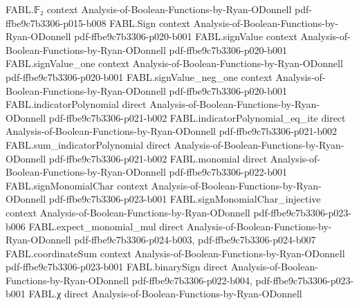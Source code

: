 \begin{theorem}
\label{FABL.heterogeneousBiasedFourierCoeff_eq_prod_sigma_mul_partialDerivative}
\leanok
{}
\proofstep
  {FABL.𝔽₂}
  {context}
  {Analysis-of-Boolean-Functions-by-Ryan-ODonnell}
  {pdf-ffbe9c7b3306-p015-b008}
\proofstep
  {FABL.Sign}
  {context}
  {Analysis-of-Boolean-Functions-by-Ryan-ODonnell}
  {pdf-ffbe9c7b3306-p020-b001}
\proofstep
  {FABL.signValue}
  {context}
  {Analysis-of-Boolean-Functions-by-Ryan-ODonnell}
  {pdf-ffbe9c7b3306-p020-b001}
\proofstep
  {FABL.signValue_one}
  {context}
  {Analysis-of-Boolean-Functions-by-Ryan-ODonnell}
  {pdf-ffbe9c7b3306-p020-b001}
\proofstep
  {FABL.signValue_neg_one}
  {context}
  {Analysis-of-Boolean-Functions-by-Ryan-ODonnell}
  {pdf-ffbe9c7b3306-p020-b001}
\proofstep
  {FABL.indicatorPolynomial}
  {direct}
  {Analysis-of-Boolean-Functions-by-Ryan-ODonnell}
  {pdf-ffbe9c7b3306-p021-b002}
\proofstep
  {FABL.indicatorPolynomial_eq_ite}
  {direct}
  {Analysis-of-Boolean-Functions-by-Ryan-ODonnell}
  {pdf-ffbe9c7b3306-p021-b002}
\proofstep
  {FABL.sum_indicatorPolynomial}
  {direct}
  {Analysis-of-Boolean-Functions-by-Ryan-ODonnell}
  {pdf-ffbe9c7b3306-p021-b002}
\proofstep
  {FABL.monomial}
  {direct}
  {Analysis-of-Boolean-Functions-by-Ryan-ODonnell}
  {pdf-ffbe9c7b3306-p022-b001}
\proofstep
  {FABL.signMonomialChar}
  {context}
  {Analysis-of-Boolean-Functions-by-Ryan-ODonnell}
  {pdf-ffbe9c7b3306-p023-b001}
\proofstep
  {FABL.signMonomialChar_injective}
  {context}
  {Analysis-of-Boolean-Functions-by-Ryan-ODonnell}
  {pdf-ffbe9c7b3306-p023-b006}
\proofstep
  {FABL.expect_monomial_mul}
  {direct}
  {Analysis-of-Boolean-Functions-by-Ryan-ODonnell}
  {pdf-ffbe9c7b3306-p024-b003,
    pdf-ffbe9c7b3306-p024-b007}
\proofstep
  {FABL.coordinateSum}
  {context}
  {Analysis-of-Boolean-Functions-by-Ryan-ODonnell}
  {pdf-ffbe9c7b3306-p023-b001}
\proofstep
  {FABL.binarySign}
  {direct}
  {Analysis-of-Boolean-Functions-by-Ryan-ODonnell}
  {pdf-ffbe9c7b3306-p022-b004,
    pdf-ffbe9c7b3306-p023-b001}
\proofstep
  {FABL.χ}
  {direct}
  {Analysis-of-Boolean-Functions-by-Ryan-ODonnell}

\end{theorem}
